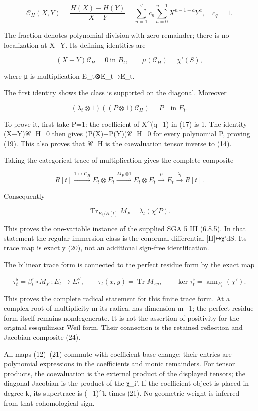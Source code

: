 \documentclass[
  11pt,
]{article}
\begin{document}
\[
\mathcal C_H(X,Y)=\frac{H(X)-H(Y)}{X-Y}
 =\sum_{n=1}^{q}c_n\sum_{a=0}^{n-1}X^{n-1-a}Y^a,
\quad c_q=1.
\tag{17}
\]

The fraction denotes polynomial division with zero remainder; there is
no localization at X−Y. Its defining identities are

\[
(X-Y)\mathcal C_H=0\ \text{in }B_t,
\qquad \mu(\mathcal C_H)=\chi'(S),
\tag{18}
\]

where μ is multiplication E\_t⊗E\_t→E\_t.

The first identity shows the class is supported on the diagonal.
Moreover

\[
(\lambda_t\otimes1)((P\otimes1)\mathcal C_H)=P
\quad\text{in }E_t.
\tag{19}
\]

To prove it, first take P=1: the coefficient of X\^{}(q−1) in (17) is 1.
The identity (X−Y)𝒞\_H=0 then gives (P(X)−P(Y))𝒞\_H=0 for every
polynomial P, proving (19). This also proves that 𝒞\_H is the
coevaluation tensor inverse to (14).

Taking the categorical trace of multiplication gives the complete
composite

\[
R[t]\xrightarrow{1\mapsto\mathcal C_H}E_t\otimes E_t
\xrightarrow{M_P\otimes1}E_t\otimes E_t
\xrightarrow{\mu}E_t\xrightarrow{\lambda_t}R[t].
\tag{20}
\]

Consequently

\[
\boxed{\operatorname{Tr}_{E_t/R[t]}M_P
 =\lambda_t(\chi'P).}
\tag{21}
\]

This proves the one-variable instance of the supplied SGA 5 III (6.8.5).
In that statement the regular-immersion class is the conormal
differential {[}H{]}↦χ'dS. Its trace map is exactly (20), not an
additional sign-free identification.

The bilinear trace form is connected to the perfect residue form by the
exact map

\[
\tau_t^\flat=\beta_t^\flat\circ M_{\chi'}:E_t\longrightarrow E_t^\vee,
\qquad \tau_t(x,y)=\operatorname{Tr}M_{xy},
\qquad \ker\tau_t^\flat=\operatorname{ann}_{E_t}(\chi').
\tag{21a}
\]

This proves the complete radical statement for this finite trace form.
At a complex root of multiplicity m its radical has dimension m−1; the
perfect residue form itself remains nondegenerate. It is not the
assertion of positivity for the original sesquilinear Weil form. Their
connection is the retained reflection and Jacobian composite (24).

All maps (12)--(21) commute with coefficient base change: their entries
are polynomial expressions in the coefficients and monic remainders. For
tensor products, the coevaluation is the external product of the
displayed tensors; the diagonal Jacobian is the product of the χ\_i'. If
the coefficient object is placed in degree k, its supertrace is
(−1)\^{}k times (21). No geometric weight is inferred from that
cohomological sign.
\end{document}
